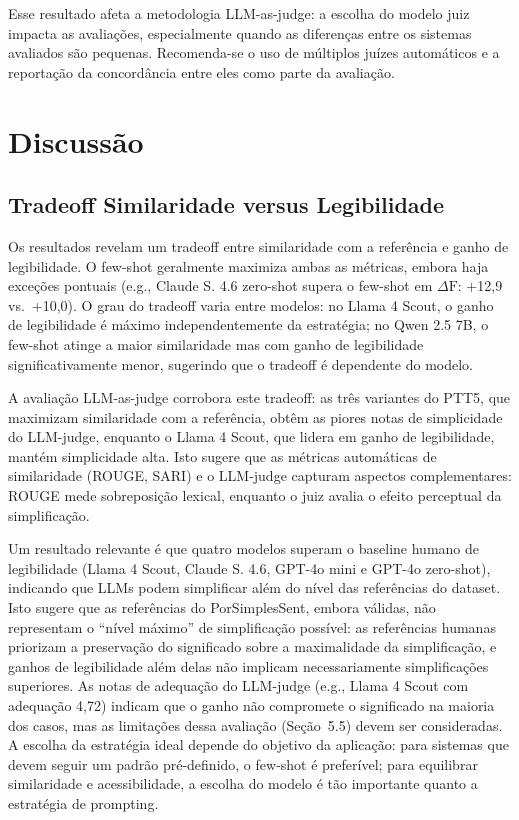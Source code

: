 \documentclass[a4paper, twocolumn, 11pt, twoside]{article}
\begin{document}
Esse resultado afeta a metodologia
LLM-as-judge: a escolha do modelo juiz impacta as
avaliações, especialmente quando as diferenças entre os sistemas
avaliados são pequenas. Recomenda-se o uso de múltiplos juízes
automáticos e a reportação da concordância entre eles como parte da
avaliação.

\section{Discussão}

\subsection{Tradeoff Similaridade versus Legibilidade}

Os resultados revelam um tradeoff entre similaridade com a referência
e ganho de legibilidade. O few-shot geralmente maximiza ambas as
métricas, embora haja exceções pontuais (e.g., Claude S. 4.6
zero-shot supera o few-shot em $\Delta \mathrm{F}$: +12,9 vs.\ +10,0).
O grau do tradeoff varia entre modelos: no Llama 4 Scout, o ganho de
legibilidade é máximo independentemente da estratégia; no Qwen 2.5 7B,
o few-shot atinge a maior similaridade mas com ganho de legibilidade
significativamente menor, sugerindo que o tradeoff é dependente do
modelo.

A avaliação LLM-as-judge corrobora este tradeoff: as três variantes
do PTT5, que maximizam similaridade com a referência, obtêm as piores
notas de simplicidade do LLM-judge, enquanto o Llama 4 Scout, que
lidera em ganho de legibilidade, mantém simplicidade alta. Isto sugere
que as métricas automáticas de similaridade (ROUGE, SARI) e o
LLM-judge capturam aspectos complementares: ROUGE mede sobreposição
lexical, enquanto o juiz avalia o efeito perceptual da simplificação.

Um resultado relevante é que quatro modelos superam o
baseline humano de legibilidade (Llama 4 Scout, Claude S. 4.6,
GPT-4o mini e GPT-4o zero-shot), indicando que LLMs podem simplificar
além do nível das referências do dataset. Isto sugere que as
referências do PorSimplesSent, embora válidas, não representam o
``nível máximo'' de simplificação possível: as referências humanas
priorizam a preservação do significado sobre a maximalidade da
simplificação, e ganhos de legibilidade além delas não implicam
necessariamente simplificações superiores. As notas de adequação do
LLM-judge (e.g., Llama 4 Scout com adequação 4,72) indicam que o
ganho não compromete o significado na maioria dos casos, mas as
limitações dessa avaliação (Seção~5.5) devem ser consideradas.
A escolha da estratégia
ideal depende do objetivo da aplicação: para sistemas que devem seguir
um padrão pré-definido, o few-shot é preferível; para equilibrar
similaridade e acessibilidade, a escolha do modelo é tão importante
quanto a estratégia de prompting.
\end{document}
